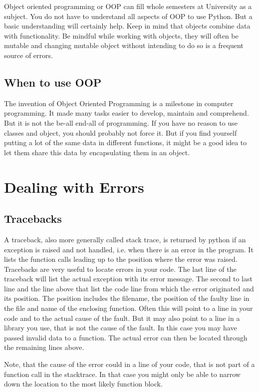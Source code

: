 \documentclass{article}
\begin{document}
Object oriented programming or OOP can fill whole semesters at University as a subject.
You do not have to understand all aspects of OOP to use Python.
But a basic understanding will certainly help.
Keep in mind that objects combine data with functionality.
Be mindful while working with objects, they will often be mutable and
changing mutable object without intending to do so is a frequent source of errors.

\subsection{When to use OOP}

The invention of Object Oriented Programming is a milestone in computer programming.
It made many tasks easier to develop, maintain and comprehend.
But it is not the be-all end-all of programming.
If you have no reason to use classes and object, you should probably not force it.
But if you find yourself putting a lot of the same data in different functions,
it might be a good idea to let them share this data by encapsulating them
in an object.


\section{Dealing with Errors}

\subsection{Tracebacks}

A traceback, also more generally called stack trace, is returned by python if
an exception is raised and not handled, i.e. when there is an error in the program.
It lists the function calls leading up to the position where the error was raised.
Tracebacks are very useful to locate errors in your code.
The last line of the traceback will list the actual exception with its error message.
The second to last line and the line above that list the code line from which the error
originated and its position.
The position includes the filename,
the position of the faulty line in the file and name of the enclosing function.
Often this will point to a line in your code and to the actual cause of the fault.
But it may also point to a line in a library you use, that is not the cause of the
fault.
In this case you may have passed invalid data to a function.
The actual error can then be located through the remaining lines above.

Note, that the cause of the error could in a line of your code, that is not part of
a function call in the stacktrace.
In that case you might only be able to narrow down the location to the most
likely function block.
\end{document}
